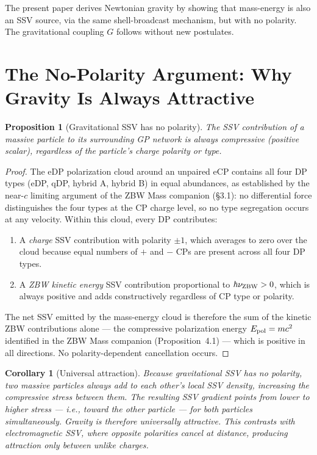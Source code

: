 \documentclass[12pt]{article}
\newtheorem{proposition}[theorem]{Proposition}
\newtheorem{corollary}[theorem]{Corollary}
\begin{document}
The present paper derives Newtonian gravity by showing that mass-energy is
also an SSV source, via the same shell-broadcast mechanism, but with no
polarity.  The gravitational coupling $G$ follows without new postulates.

\section{The No-Polarity Argument: Why Gravity Is Always Attractive}
\label{sec:noPolarity}

\begin{proposition}[Gravitational SSV has no polarity]
\label{prop:noPolarity}
The SSV contribution of a massive particle to its surrounding GP network
is always compressive (positive scalar), regardless of the particle's
charge polarity or type.
\end{proposition}

\begin{proof}
The eDP polarization cloud around an unpaired eCP contains all four DP
types (eDP, qDP, hybrid A, hybrid B) in equal abundances, as established
by the near-$c$ limiting argument of the ZBW Mass companion (\S3.1): no
differential force distinguishes the four types at the CP charge level,
so no type segregation occurs at any velocity.  Within this cloud, every
DP contributes:
\begin{enumerate}[noitemsep]
  \item A \emph{charge} SSV contribution with polarity $\pm1$, which
    averages to zero over the cloud because equal numbers of $+$ and $-$
    CPs are present across all four DP types.
  \item A \emph{ZBW kinetic energy} SSV contribution proportional to
    $\hbar\nu_{\rm ZBW} > 0$, which is always positive and adds
    constructively regardless of CP type or polarity.
\end{enumerate}
The net SSV emitted by the mass-energy cloud is therefore the sum of the
kinetic ZBW contributions alone --- the compressive polarization energy
$E_{\rm pol} = mc^2$ identified in the ZBW Mass companion
(Proposition~4.1) --- which is positive in all directions.  No
polarity-dependent cancellation occurs.
\end{proof}

\begin{corollary}[Universal attraction]
Because gravitational SSV has no polarity, two massive particles always
add to each other's local SSV density, increasing the compressive stress
between them.  The resulting SSV gradient points from lower to higher
stress --- i.e., toward the other particle --- for both particles
simultaneously.  Gravity is therefore universally attractive.
This contrasts with electromagnetic SSV, where opposite polarities cancel
at distance, producing attraction only between unlike charges.
\end{corollary}
\end{document}
